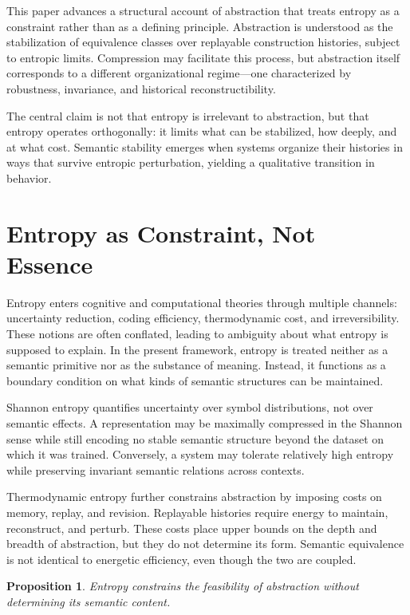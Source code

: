 \documentclass[11pt]{article}
\newtheorem{proposition}{Proposition}[section]
\begin{document}
This paper advances a structural account of abstraction that treats entropy as a constraint rather than as a defining principle. Abstraction is understood as the stabilization of equivalence classes over replayable construction histories, subject to entropic limits. Compression may facilitate this process, but abstraction itself corresponds to a different organizational regime—one characterized by robustness, invariance, and historical reconstructibility.

The central claim is not that entropy is irrelevant to abstraction, but that entropy operates orthogonally: it limits what can be stabilized, how deeply, and at what cost. Semantic stability emerges when systems organize their histories in ways that survive entropic perturbation, yielding a qualitative transition in behavior.

\section{Entropy as Constraint, Not Essence}

Entropy enters cognitive and computational theories through multiple channels: uncertainty reduction, coding efficiency, thermodynamic cost, and irreversibility. These notions are often conflated, leading to ambiguity about what entropy is supposed to explain. In the present framework, entropy is treated neither as a semantic primitive nor as the substance of meaning. Instead, it functions as a boundary condition on what kinds of semantic structures can be maintained.

Shannon entropy quantifies uncertainty over symbol distributions, not over semantic effects. A representation may be maximally compressed in the Shannon sense while still encoding no stable semantic structure beyond the dataset on which it was trained. Conversely, a system may tolerate relatively high entropy while preserving invariant semantic relations across contexts.

Thermodynamic entropy further constrains abstraction by imposing costs on memory, replay, and revision. Replayable histories require energy to maintain, reconstruct, and perturb. These costs place upper bounds on the depth and breadth of abstraction, but they do not determine its form. Semantic equivalence is not identical to energetic efficiency, even though the two are coupled.

\begin{proposition}
Entropy constrains the feasibility of abstraction without determining its semantic content.
\end{proposition}
\end{document}
